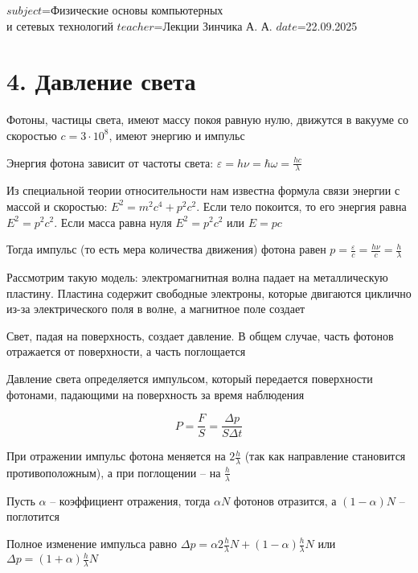 $subject$=Физические основы компьютерных \\ и сетевых технологий
$teacher$=Лекции Зинчика А. А.
$date$=22.09.2025


\section{4. Давление света}

Фотоны, частицы света, имеют массу покоя равную нулю, движутся в вакууме со скоростью $c = 3 \cdot 10^8$, имеют энергию и импульс

Энергия фотона зависит от частоты света: $\varepsilon = h \nu = \hbar \omega = \frac{h c}{\lambda}$

Из специальной теории относительности нам известна формула связи энергии с массой и скоростью: $E^2 = m^2 c^4 + p^2 c^2$. Если тело покоится, то его энергия равна $E^2 = p^2 c^2$. Если масса равна нуля $E^2 = p^2 c^2$ или $E = p c$

Тогда импульс (то есть мера количества движения) фотона равен $p = \frac{\varepsilon}{c} = \frac{h \nu}{c} = \frac{h}{\lambda}$

Рассмотрим такую модель: электромагнитная волна падает на металлическую пластину. Пластина содержит свободные электроны, которые двигаются циклично из-за электрического поля в волне, а магнитное поле создает 

Свет, падая на поверхность, создает давление. В общем случае, часть фотонов отражается от поверхности, а часть поглощается

Давление света определяется импульсом, который передается поверхности фотонами, падающими на поверхность за время наблюдения

\[P = \frac{F}{S} = \frac{\Delta p}{S \Delta t}\]

При отражении импульс фотона меняется на $2 \frac{h}{\lambda}$ (так как направление становится противоположным), а при поглощении -- на $\frac{h}{\lambda}$

Пусть $\alpha$ -- коэффициент отражения, тогда $\alpha N$ фотонов отразится, а $(1 - \alpha) N$ -- поглотится

Полное изменение импульса равно $\Delta p = \alpha 2\frac{h}{\lambda} N + (1 - \alpha) \frac{h}{\lambda} N$ или $\Delta p = (1 + \alpha) \frac{h}{\lambda} N$

